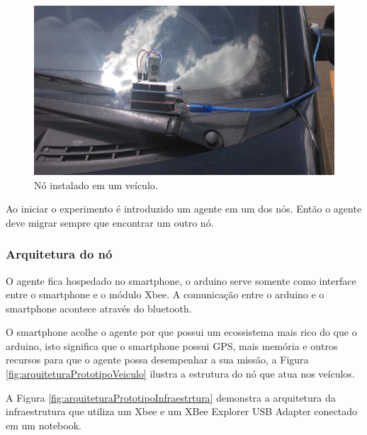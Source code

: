\begin{figure}[htbp]
	\centering
	\includegraphics[scale=0.06]{metodologia/figuras/noInstaladoVeiculo.jpg}
	\caption{Nó instalado em um veículo.}
	\label{fig:noInstaladoVeiculo}
\end{figure}

Ao iniciar o experimento é introduzido um agente em um dos nós. Então o agente deve migrar sempre que encontrar um outro nó.

\subsubsection{Arquitetura do nó}

O agente fica hospedado no smartphone, o arduino serve somente como interface entre o smartphone e o módulo Xbee. A comunicação entre o arduino e o smartphone acontece através do bluetooth. 

O smartphone acolhe o agente por que possui um ecossistema mais rico do que o arduino, isto significa que o smartphone possui GPS, mais memória e outros recursos para que o agente possa desempenhar a sua missão, a Figura \ref{fig:arquiteturaPrototipoVeiculo} ilustra a estrutura do nó que atua nos veículos. 

A Figura \ref{fig:arquiteturaPrototipoInfraestrtura} demonstra a arquitetura da infraestrutura que utiliza um Xbee e um XBee Explorer USB Adapter conectado em um notebook.

